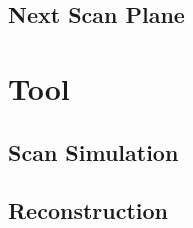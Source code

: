 \section{Next Scan Plane}\label{section:nextscanplane}

\chapter{Tool}

\section{Scan Simulation}\label{section:simulatescan}

\section{Reconstruction}\label{section:reconstruction}
